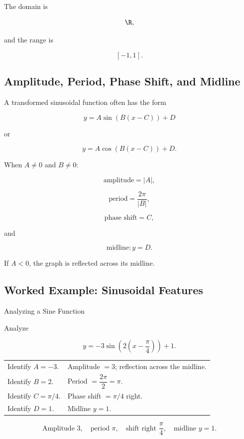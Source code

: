 The domain is

\[ \R, \]

and the range is

\[ [-1,1]. \]

\subsection{Amplitude, Period, Phase Shift, and Midline}
\label{subsec:sinusoidal-transformations}

A transformed sinusoidal function often has the form

\[ y=A\sin(B(x-C))+D \]

or

\[ y=A\cos(B(x-C))+D. \]

When \(A\neq0\) and \(B\neq0\):

\[ \text{amplitude}=|A|, \]

\[ \text{period}=\frac{2\pi}{|B|}, \]

\[ \text{phase shift}=C, \]

and

\[ \text{midline}: y=D. \]

If \(A<0\), the graph is reflected across its midline.

\subsection{Worked Example: Sinusoidal Features}
\label{subsec:worked-sinusoidal}

\begin{workedexamplebox}{Analyzing a Sine Function}

Analyze

\[ y=-3\sin\left(2\left(x-\frac{\pi}{4}\right)\right)+1. \]

\begin{tabularx}{\textwidth}{@{}>{\raggedright\arraybackslash}p{}X@{}}
Identify \(A=-3\). &
Amplitude \(=3\); reflection across the midline.\\
Identify \(B=2\). &
Period \(=\dfrac{2\pi}{2}=\pi\).\\
Identify \(C=\pi/4\). &
Phase shift \(=\pi/4\) right.\\
Identify \(D=1\). &
Midline \(y=1\).
\end{tabularx}

\begin{answerbox}
\[
\boxed{
\text{Amplitude }3,\quad
\text{period }\pi,\quad
\text{shift right }\frac{\pi}{4},\quad
\text{midline }y=1.}
\]
\end{answerbox}
\end{workedexamplebox}

